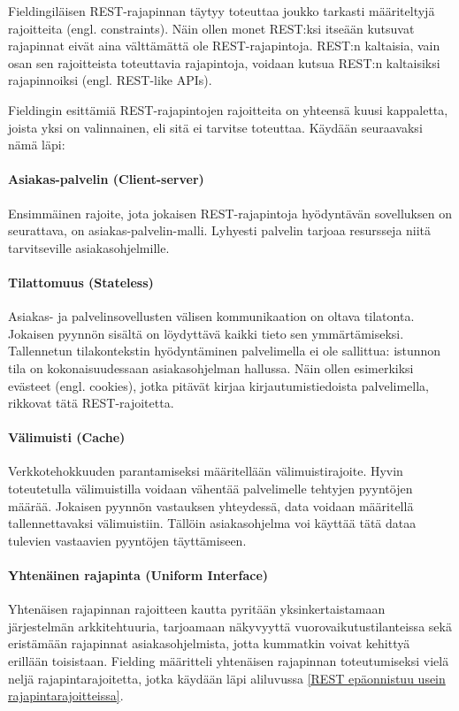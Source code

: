 Fieldingiläisen REST-rajapinnan täytyy toteuttaa joukko tarkasti määriteltyjä rajoitteita (engl. constraints). Näin ollen monet REST:ksi itseään kutsuvat rajapinnat eivät aina välttämättä ole REST-rajapintoja. REST:n kaltaisia, vain osan sen rajoitteista toteuttavia rajapintoja, voidaan kutsua REST:n kaltaisiksi rajapinnoiksi (engl. REST-like APIs). \cite{FieldingRThesisREST, rest-apis-must-be-hypertext-driven}

Fieldingin esittämiä REST-rajapintojen rajoitteita on yhteensä kuusi kappaletta, joista yksi on valinnainen, eli sitä ei tarvitse toteuttaa. Käydään seuraavaksi nämä läpi: \cite{FieldingRThesisREST}

\paragraph{Asiakas-palvelin (Client-server)} Ensimmäinen rajoite, jota jokaisen REST-rajapintoja hyödyntävän sovelluksen on seurattava, on asiakas-palvelin-malli. Lyhyesti palvelin tarjoaa resursseja niitä tarvitseville asiakasohjelmille.

\paragraph{Tilattomuus (Stateless)} Asiakas- ja palvelinsovellusten välisen kommunikaation on oltava tilatonta. Jokaisen pyynnön sisältä on löydyttävä kaikki tieto sen ymmärtämiseksi. Tallennetun tilakontekstin hyödyntäminen palvelimella ei ole sallittua: istunnon tila on kokonaisuudessaan asiakasohjelman hallussa. Näin ollen esimerkiksi evästeet (engl. cookies), jotka pitävät kirjaa kirjautumistiedoista palvelimella, rikkovat tätä REST-rajoitetta.

\paragraph{Välimuisti (Cache)} Verkkotehokkuuden parantamiseksi määritellään välimuistirajoite. Hyvin toteutetulla välimuistilla voidaan vähentää palvelimelle tehtyjen pyyntöjen määrää. Jokaisen pyynnön vastauksen yhteydessä, data voidaan määritellä tallennettavaksi välimuistiin. Tällöin asiakasohjelma voi käyttää tätä dataa tulevien vastaavien pyyntöjen täyttämiseen.

\paragraph{Yhtenäinen rajapinta (Uniform Interface)} Yhtenäisen rajapinnan rajoitteen kautta pyritään yksinkertaistamaan järjestelmän arkkitehtuuria, tarjoamaan näkyvyyttä vuorovaikutustilanteissa sekä eristämään rajapinnat asiakasohjelmista, jotta kummatkin voivat kehittyä erillään toisistaan. Fielding määritteli yhtenäisen rajapinnan toteutumiseksi vielä neljä rajapintarajoitetta, jotka käydään läpi aliluvussa \ref{REST epäonnistuu usein rajapintarajoitteissa}.

